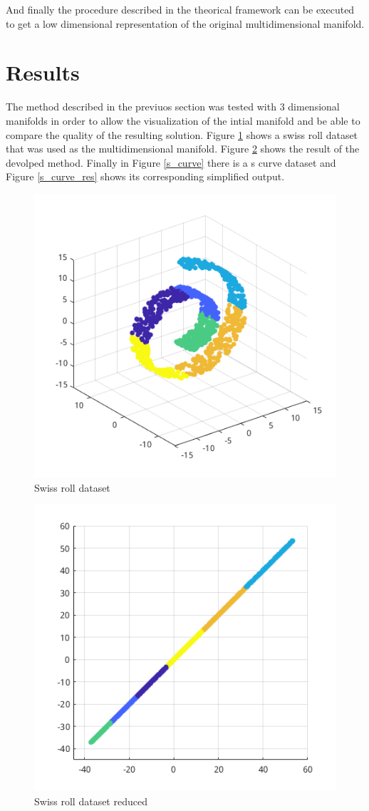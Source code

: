\documentclass[12pt,journal]{IEEEtran}
\begin{document}
\vspace{0.5cm}

And finally the procedure described in the theorical framework can be executed
to get a low dimensional representation of the original multidimensional
manifold.

\section{Results}

The method described in the previuos section was tested with 3 dimensional
manifolds in order to allow the visualization of the intial manifold and be able
to compare the quality of the resulting solution. Figure \ref{swiss} shows
a swiss roll dataset that was used as the multidimensional manifold. Figure
\ref{swiss_res} shows the result of the devolped method. Finally in Figure       
\ref{s_curve} there is a s curve dataset and Figure \ref{s_curve_res} shows its  
corresponding simplified output.

\begin{figure}[H]
    \centering
    \includegraphics[width=0.7\linewidth]{images/swiss_roll.png}
    \caption{Swiss roll dataset}
    \label{swiss}
\end{figure}

\begin{figure}[H]
    \centering
    \includegraphics[width=0.6\linewidth]{images/swiss_roll_result.png}
    \caption{Swiss roll dataset reduced}
    \label{swiss_res}
\end{figure}
\end{document}
